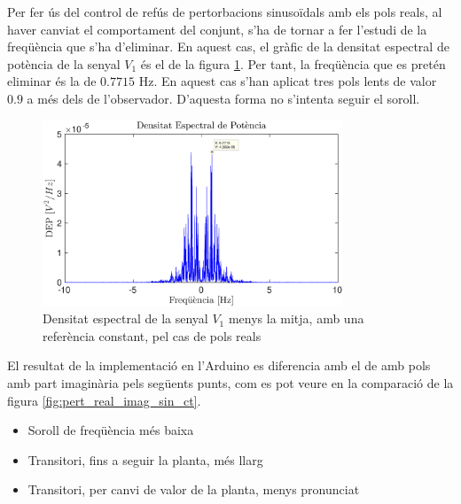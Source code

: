 \documentclass[12pt,a4paper,final,twoside,openright]{report}
\begin{document}
Per fer ús del control de refús de pertorbacions sinusoïdals amb els pols reals, al haver canviat el comportament del conjunt, s'ha de tornar a fer l'estudi de la freqüència que s'ha d'eliminar. En aquest cas, el gràfic de la densitat espectral de potència de la senyal $V_1$ és el de la figura \ref{fig:power_spectral_nomean_pert_ct_pols_reals}. Per tant, la freqüència que es pretén eliminar és la de $0.7715$ Hz. En aquest cas s'han aplicat tres pols lents de valor $0.9$ a més dels de l'observador. D'aquesta forma no s'intenta seguir el soroll.

\begin{figure}[h]
\centering
\includegraphics[width=0.8\textwidth]{Imatges/power_spectral_nomean_pert_ct_pols_reals.eps}
\caption{Densitat espectral de la senyal $V_1$ menys la mitja, amb una referència constant, pel cas de pols reals\label{fig:power_spectral_nomean_pert_ct_pols_reals}}
\end{figure}

El resultat de la implementació en l'Arduino es diferencia amb el de amb pols amb part imaginària pels següents punts, com es pot veure en la comparació de la figura \ref{fig:pert_real_imag_sin_ct}.
\begin{itemize}
\item Soroll de freqüència més baixa
\item Transitori, fins a seguir la planta, més llarg
\item Transitori, per canvi de valor de la planta, menys pronunciat
\end{itemize}
\end{document}
